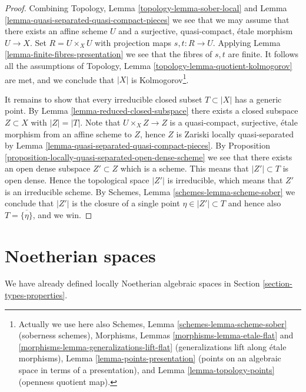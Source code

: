 \begin{proof}
Combining
Topology, Lemma \ref{topology-lemma-sober-local}
and
Lemma \ref{lemma-quasi-separated-quasi-compact-pieces}
we see that we may assume that there exists an affine scheme $U$
and a surjective, quasi-compact, \'etale morphism $U \to X$.
Set $R = U \times_X U$ with projection maps $s, t : R \to U$. Applying
Lemma \ref{lemma-finite-fibres-presentation}
we see that the fibres of $s, t$ are finite. It follows all the assumptions of
Topology, Lemma \ref{topology-lemma-quotient-kolmogorov}
are met, and we conclude that $|X|$ is Kolmogorov\footnote{
Actually we use here also
Schemes, Lemma \ref{schemes-lemma-scheme-sober} (soberness schemes),
Morphisms, Lemmas \ref{morphisms-lemma-etale-flat}
and \ref{morphisms-lemma-generalizations-lift-flat} (generalizations
lift along \'etale morphisms),
Lemma \ref{lemma-points-presentation} (points on an algebraic space in
terms of a presentation), and
Lemma \ref{lemma-topology-points} (openness quotient map).}.

\medskip\noindent
It remains to show that every irreducible closed subset
$T \subset |X|$ has a generic point. By
Lemma \ref{lemma-reduced-closed-subspace}
there exists a closed subspace $Z \subset X$ with $|Z| = |T|$.
Note that $U \times_X Z \to Z$ is a quasi-compact, surjective, \'etale
morphism from an affine scheme to $Z$, hence $Z$ is Zariski locally
quasi-separated by
Lemma \ref{lemma-quasi-separated-quasi-compact-pieces}.
By
Proposition \ref{proposition-locally-quasi-separated-open-dense-scheme}
we see that there exists an open dense subspace $Z' \subset Z$
which is a scheme. This means that $|Z'| \subset T$ is open dense.
Hence the topological space $|Z'|$ is irreducible, which means that
$Z'$ is an irreducible scheme. By
Schemes, Lemma \ref{schemes-lemma-scheme-sober}
we conclude that $|Z'|$ is the closure of a single point
$\eta \in |Z'| \subset T$ and hence also $T = \overline{\{\eta\}}$, and we win.
\end{proof}










\section{Noetherian spaces}
\label{section-noetherian}

\noindent
We have already defined locally Noetherian algebraic spaces in
Section \ref{section-types-properties}.

